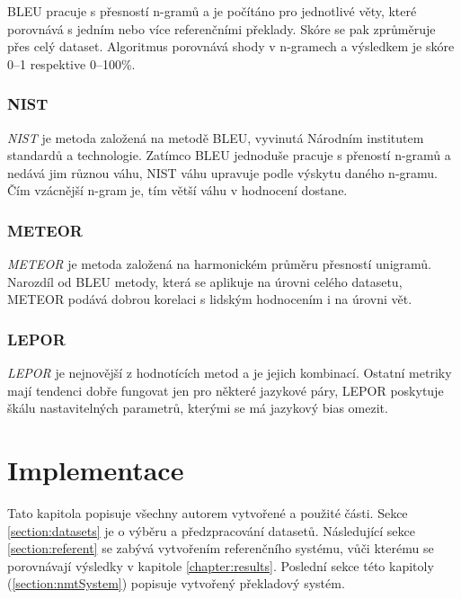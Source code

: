 BLEU pracuje s přesností n-gramů a je počítáno pro jednotlivé věty, které porovnává s jedním nebo více referenčními překlady. Skóre se pak zprůměruje přes celý dataset. Algoritmus porovnává shody v n-gramech a výsledkem je skóre 0--1 respektive 0--100\%.

\subsection{NIST}
\emph{NIST} \cite{NIST} je metoda založená na metodě BLEU, vyvinutá Národním institutem standardů a technologie. Zatímco BLEU jednoduše pracuje s přeností n-gramů a nedává jim různou váhu, NIST váhu upravuje podle výskytu daného n-gramu. Čím vzácnější n-gram je, tím větší váhu v hodnocení dostane.


\subsection{METEOR}
\emph{METEOR} \cite{METEOR} je metoda založená na harmonickém průměru přesností unigramů. Narozdíl od BLEU metody, která se aplikuje na úrovni celého datasetu, METEOR podává dobrou korelaci s lidským hodnocením i na úrovni vět.

\subsection{LEPOR}
\emph{LEPOR} \cite{LEPOR} je nejnovější z hodnotících metod a je jejich kombinací. Ostatní metriky mají tendenci dobře fungovat jen pro některé jazykové páry, LEPOR poskytuje škálu nastavitelných parametrů, kterými se má jazykový bias omezit.


\chapter{Implementace} \label{chapter:implementation}
Tato kapitola popisuje všechny autorem vytvořené a použité části. Sekce \ref{section:datasets} je o výběru a předzpracování datasetů. Následující sekce \ref{section:referent} se zabývá vytvořením referenčního systému, vůči kterému se porovnávají výsledky v kapitole \ref{chapter:results}. Poslední sekce této kapitoly (\ref{section:nmtSystem}) popisuje vytvořený překladový systém.

